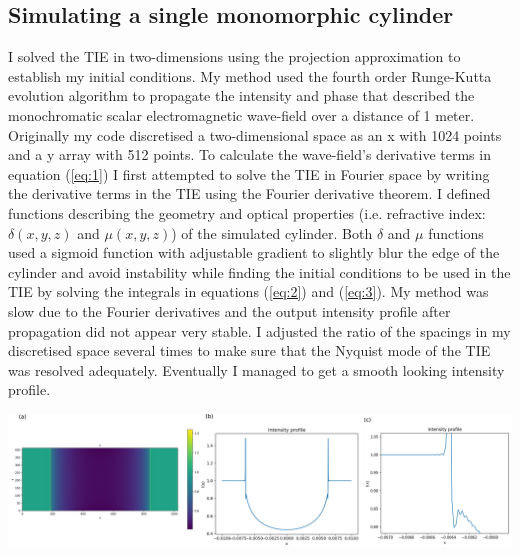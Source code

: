\documentclass[9pt, a4paper]{article}
\newenvironment{Figure}
    {\par\medskip\noindent\minipage{\linewidth}}
    {\endminipage\par\medskip}
\begin{document}
\subsection{Simulating a single monomorphic cylinder}
I solved the TIE in two-dimensions using the projection approximation to establish my initial conditions. My method used the fourth order Runge-Kutta evolution algorithm to propagate the intensity and phase that described the monochromatic scalar electromagnetic wave-field over a distance of 1 meter. Originally my code discretised a two-dimensional space as an x with 1024 points and a y array with 512 points. To calculate the wave-field's derivative terms in equation (\ref{eq:1}) I first attempted to solve the TIE in Fourier space by writing the derivative terms in the TIE using the Fourier derivative theorem. I defined functions describing the geometry and optical properties (i.e. refractive index: $\delta(x, y, z)$ and $\mu(x, y, z)$) of the simulated cylinder. Both $\delta$ and $\mu$ functions used a sigmoid function with adjustable gradient to slightly blur the edge of the cylinder and avoid instability while finding the initial conditions to be used in the TIE by solving the integrals in equations (\ref{eq:2}) and (\ref{eq:3}). My method was slow due to the Fourier derivatives and the output intensity profile after propagation did not appear very stable. I adjusted the ratio of the spacings in my discretised space several times to make sure that the Nyquist mode of the TIE was resolved adequately. Eventually I managed to get a smooth looking intensity profile.
\begin{Figure}
\centering
\includegraphics[width=\linewidth]{Fourier_intensity_profile.pdf}
\end{Figure}
\end{document}
